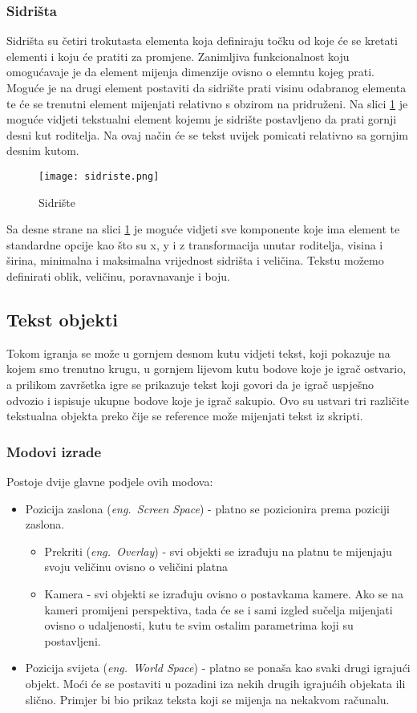 \subsubsection{Sidrišta}
Sidrišta su četiri trokutasta elementa koja definiraju točku od koje će se kretati elementi i koju će pratiti za promjene. Zanimljiva funkcionalnost koju omogućavaje je da element mijenja dimenzije ovisno o elemntu kojeg prati. Moguće je na drugi element postaviti da sidrište prati visinu odabranog elementa te će se trenutni element mijenjati relativno s obzirom na pridruženi. Na slici \ref{fig:sidriste} je moguće vidjeti tekstualni element kojemu je sidrište postavljeno da prati gornji desni kut roditelja. Na ovaj način će se tekst uvijek pomicati relativno sa gornjim desnim kutom.
\begin{figure}[h]
	\texttt{[image: sidriste.png]}
	\centering
	\caption{Sidrište}
	\label{fig:sidriste}
\end{figure}
\newline
Sa desne strane na slici \ref{fig:sidriste} je moguće vidjeti sve komponente koje ima element te standardne opcije kao što su x, y i z transformacija unutar roditelja, visina i širina, minimalna i maksimalna vrijednost sidrišta i veličina. Tekstu možemo definirati oblik, veličinu, poravnavanje i boju.

\subsection{Tekst objekti}
Tokom igranja se može u gornjem desnom kutu vidjeti tekst, koji pokazuje na kojem smo trenutno krugu, u gornjem lijevom kutu bodove koje je igrač ostvario, a prilikom završetka igre se prikazuje tekst koji govori da je igrač uspješno odvozio i ispisuje ukupne bodove koje je igrač sakupio. Ovo su ustvari tri različite tekstualna objekta preko čije se reference može mijenjati tekst iz skripti. 

\subsubsection{Modovi izrade}
Postoje dvije glavne podjele ovih modova:
\begin{itemize} 
	\item Pozicija zaslona (\emph{eng.~Screen Space}) - platno se pozicionira prema poziciji zaslona. 
		\begin{itemize}
			\item Prekriti (\emph{eng.~Overlay}) - svi objekti se izrađuju na platnu te mijenjaju svoju veličinu ovisno o veličini platna
			\item Kamera - svi objekti se izrađuju ovisno o postavkama kamere. Ako se na kameri promijeni perspektiva, tada će se i sami izgled sučelja mijenjati ovisno o udaljenosti, kutu te svim ostalim parametrima koji su postavljeni.
		\end{itemize}
	\item Pozicija svijeta (\emph{eng.~World Space}) - platno se ponaša kao svaki drugi igrajući objekt. Moći će se postaviti u pozadini iza nekih drugih igrajućih objekata ili slično. Primjer bi bio prikaz teksta koji se mijenja na nekakvom računalu.
\end{itemize}


